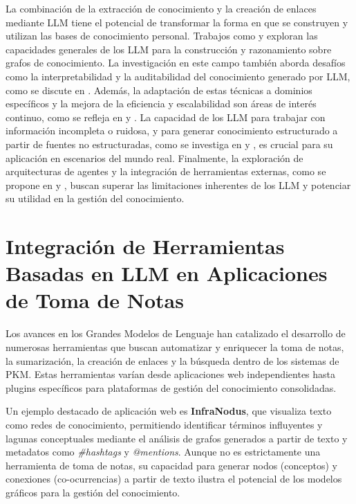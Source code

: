 La combinación de la extracción de conocimiento y la creación de enlaces mediante LLM tiene el potencial de transformar la forma en que se construyen y utilizan las bases de conocimiento personal. Trabajos como \parencite{zhuLLMsKnowledgeGraph2024} y \parencite{machadoLLMStoreLeveraging} exploran las capacidades generales de los LLM para la construcción y razonamiento sobre grafos de conocimiento. La investigación en este campo también aborda desafíos como la interpretabilidad y la auditabilidad del conocimiento generado por LLM, como se discute en \parencite{fengOntologygroundedAutomaticKnowledge2024}. Además, la adaptación de estas técnicas a dominios específicos y la mejora de la eficiencia y escalabilidad son áreas de interés continuo, como se refleja en \parencite{biLPNLScalableLink2024} y \parencite{parkEnhancingFutureLink2024}. La capacidad de los LLM para trabajar con información incompleta o ruidosa, y para generar conocimiento estructurado a partir de fuentes no estructuradas, como se investiga en \parencite{songOpenFactFactualityEnhanced2023} y \parencite{qianOpenDomainKnowledge2023}, es crucial para su aplicación en escenarios del mundo real. Finalmente, la exploración de arquitecturas de agentes y la integración de herramientas externas, como se propone en \parencite{kommineniHumanExpertsMachines2024} y \parencite{abolhasaniLeveragingLLMAutomated2024}, buscan superar las limitaciones inherentes de los LLM y potenciar su utilidad en la gestión del conocimiento.

\section{Integración de Herramientas Basadas en LLM en Aplicaciones de Toma de Notas}
\label{sec:integracion_llm_pkm}
Los avances en los Grandes Modelos de Lenguaje han catalizado el desarrollo de numerosas herramientas que buscan automatizar y enriquecer la toma de notas, la sumarización, la creación de enlaces y la búsqueda dentro de los sistemas de PKM. Estas herramientas varían desde aplicaciones web independientes hasta plugins específicos para plataformas de gestión del conocimiento consolidadas.

Un ejemplo destacado de aplicación web es \textbf{InfraNodus}, que visualiza texto como redes de conocimiento, permitiendo identificar términos influyentes y lagunas conceptuales mediante el análisis de grafos generados a partir de texto y metadatos como \textit{\#hashtags} y \textit{@mentions}. Aunque no es estrictamente una herramienta de toma de notas, su capacidad para generar nodos (conceptos) y conexiones (co-ocurrencias) a partir de texto ilustra el potencial de los modelos gráficos para la gestión del conocimiento.

